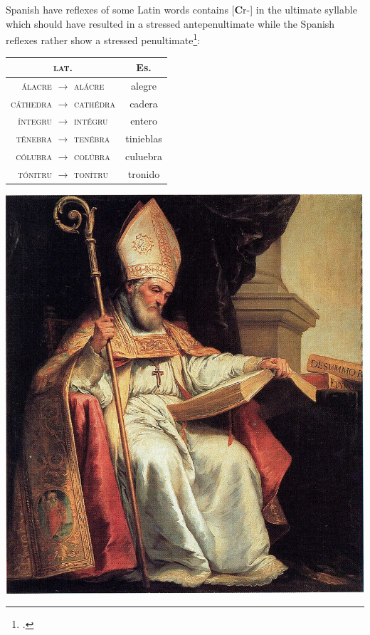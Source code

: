 \documentclass{report}[12pt]
\begin{document}
Spanish have reflexes of some Latin words contains [\textbf{C}r-] in the ultimate syllable which should have resulted in a stressed antepenultimate while the Spanish reflexes rather show a stressed penultimate\footcite[p.~115]{lloyd_spanish}:
\begin{center}
  \begin{tabular}{c c}
  \textsc{lat.} & Es. \\
  \hline
  \textsc{\'{a}lacre} $\rightarrow$ \textsc{al\'{a}cre} & alegre \\
  \textsc{c\'{a}thedra} $\rightarrow$ \textsc{cath\'{e}dra} & cadera \\
  \textsc{\'{i}ntegru} $\rightarrow$ \textsc{int\'{e}gru} & entero \\
  \textsc{t\'{e}nebra} $\rightarrow$ \textsc{ten\'{e}bra} & tinieblas \\
  \textsc{c\'{o}lubra} $\rightarrow$ \textsc{col\'{u}bra} & culuebra \\
  \textsc{t\'{o}nitru} $\rightarrow$ \textsc{ton\'{i}tru} & tronido \\
  \end{tabular}
\end{center}

\pagebreak

\includegraphics[scale=5.0]{isidorus.jpeg}
\end{document}
